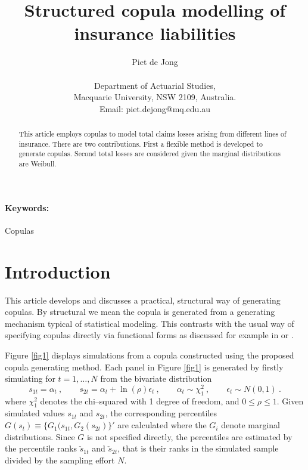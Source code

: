 \documentclass[a4paper,12pt]{article}
\newcommand{\eps}{\epsilon}
\newcommand{\fref}[1]{Figure \ref{#1}}
\begin{document}
\title{Structured copula modelling of insurance liabilities}
\author{Piet de Jong
\\\\ \small Department of Actuarial Studies, \\ \small Macquarie
University, NSW 2109, Australia. \\ \small Email:
piet.dejong@mq.edu.au}

\date{}
\maketitle

\begin{abstract}
This article employs copulas to model total claims losses arising from different lines of insurance.   There are two contributions.   First a flexible method is developed to generate copulas.   Second total losses are considered given the marginal distributions are Weibull.
\end{abstract}

\paragraph{Keywords:}Copulas

\section{Introduction}

This article develops and discusses a practical, structural way of generating copulas.   By structural we mean the copula is generated from a generating mechanism typical of statistical modeling.   This contrasts with the usual way of specifying copulas directly via functional forms as discussed for example in  or .

\fref{fig1} displays  simulations from a copula constructed using  the proposed copula generating method. Each  panel in \fref{fig1} is generated by firstly simulating for $t=1,\ldots, N$ from the bivariate distribution
\begin{equation}\label{chi1}
s_{1t}=\alpha_t\ , \qquad s_{2t}=\alpha_t+\ln(\rho)\eps_t\ , \qquad \alpha_t\sim\chi_1^2\ ,\qquad \eps_t\sim N(0,1)\ .
\end{equation}
where $\chi^2_1$ denotes the chi--squared with 1 degree of freedom, and $0\le\rho\le 1$. Given simulated values $s_{1t}$ and $s_{2t}$, the corresponding percentiles $G(s_t)\equiv \{G_1(s_{1t},G_2(s_{2t})\}'$ are calculated where the $G_i$ denote marginal distributions.   Since $G$ is not specified directly, the percentiles are estimated by the percentile ranks $\check s_{1t}$ and $\check s_{2t}$, that is their ranks in the simulated sample divided by the sampling effort $N$.
\end{document}
